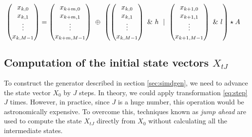 \documentclass[preprint,1p,times]{elsarticle}
\begin{document}
\begin{align}
\label{eq:msmt19937}
\begin{pmatrix}x_{k,0} \\ x_{k,1} \\ \vdots \\ x_{k,M-1} \end{pmatrix}
&= \begin{pmatrix}x_{k+m, 0} \\ x_{k+m,1} \\ \vdots \\ x_{k+m,M-1} \end{pmatrix} ~\mathbin{\oplus}~ \left(\begin{pmatrix}x_{k,0} \\ x_{k,1} \\ \vdots \\ x_{k,M-1} \end{pmatrix}~\&~h ~\mid~ \begin{pmatrix}x_{k+1,0} \\ x_{k+1,1} \\ \vdots \\ x_{k+1,M-1}  \end{pmatrix}~\&~l\right) \star A
\end{align}

\subsection{Computation of the initial state vectors $X_{tJ}$}
To construct the generator described in section \ref{sec:simdgen}, we need to advance the state vector $X_0$ by $J$ steps. In theory, we could apply transformation \eqref{eq:step} $J$ times. However, in practice, since $J$ is a huge number, this operation would be astronomically expensive. 
To overcome this, techniques known as \textit{jump ahead} are used to compute the state $X_{tJ}$ directly from $X_0$ without calculating all the intermediate states.
\end{document}

